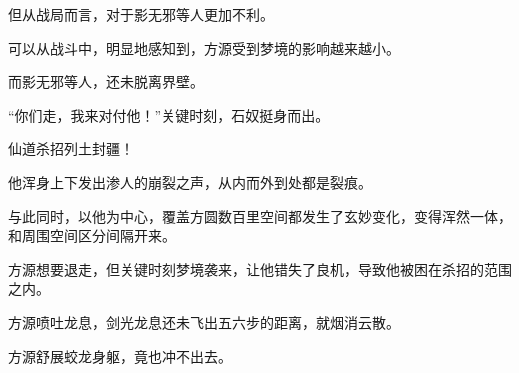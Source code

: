 \begin{this_body}
但从战局而言，对于影无邪等人更加不利。

可以从战斗中，明显地感知到，方源受到梦境的影响越来越小。

而影无邪等人，还未脱离界壁。

“你们走，我来对付他！”关键时刻，石奴挺身而出。

仙道杀招列土封疆！

他浑身上下发出渗人的崩裂之声，从内而外到处都是裂痕。

与此同时，以他为中心，覆盖方圆数百里空间都发生了玄妙变化，变得浑然一体，和周围空间区分间隔开来。

方源想要退走，但关键时刻梦境袭来，让他错失了良机，导致他被困在杀招的范围之内。

方源喷吐龙息，剑光龙息还未飞出五六步的距离，就烟消云散。

方源舒展蛟龙身躯，竟也冲不出去。

\end{this_body}

